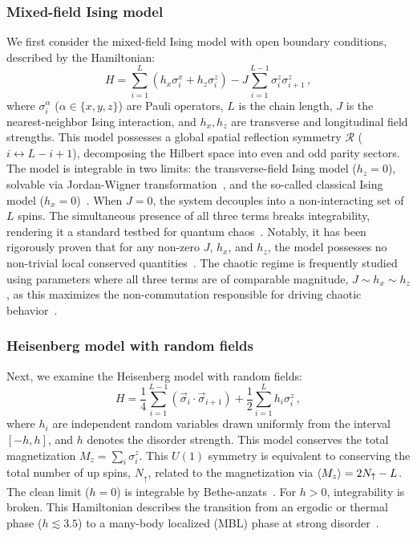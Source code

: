\documentclass[pra,twocolumn,aps,showpacs,superscriptaddress,longbibliography]{revtex4-2}
\begin{document}
\subsubsection{Mixed-field Ising model}\label{sec:ising}
We first consider the mixed-field Ising model with open boundary conditions, described by the Hamiltonian:
\begin{equation}\label{eq:H:ising}
H = \sum_{i=1}^L \left( h_x \sigma_i^x + h_z \sigma_i^z \right) - J \sum_{i=1}^{L-1} \sigma_i^z \sigma_{i+1}^z \, ,
\end{equation}
where $\sigma_i^\alpha$ ($\alpha \in \{x,y,z\}$) are Pauli operators, $L$ is the chain length, $J$ is the nearest-neighbor Ising interaction, and $h_x, h_z$ are transverse and longitudinal field strengths. This model possesses a global spatial reflection symmetry $\mathcal{R}$ ($i \leftrightarrow L-i+1$), decomposing the Hilbert space into even and odd parity sectors. The model is integrable in two limits: the transverse-field Ising model ($h_z = 0$), solvable via Jordan-Wigner transformation~\cite{sachdev_2011_quantum}, and the so-called classical Ising model ($h_x = 0$)~\cite{baxter_2007_exactly}. When $J=0$, the system decouples into a non-interacting set of $L$ spins. The simultaneous presence of all three terms breaks integrability, rendering it a standard testbed for quantum chaos~\cite{kim_2014_testing,garrison_2018_does,borgonovi_2016_quantum}. Notably, it has been rigorously proven that for any non-zero $J$, $h_x$, and $h_z$, the model possesses no non-trivial local conserved quantities~\cite{chiba_2024_proof}. The chaotic regime is frequently studied using parameters where all three terms are of comparable magnitude, $J \sim h_x \sim h_z$, as this maximizes the non-commutation responsible for driving chaotic behavior~\cite{karthik_2007_entanglement,atas_2017_quantum,camargo_2024_spread}.

\subsubsection{Heisenberg model with random fields}\label{sec:heisenberg}
Next, we examine the Heisenberg model with random fields:
\begin{equation}\label{eq:H:heisenberg}
H = \frac{1}{4}\sum_{i=1}^{L-1} \left(\vec{\sigma}_i \cdot \vec{\sigma}_{i+1}\right) + \frac{1}{2}\sum_{i=1}^L h_i \sigma_i^z \, ,
\end{equation}
where $h_i$ are independent random variables drawn uniformly from the interval $[-h, h]$, and $h$ denotes the disorder strength. This model conserves the total magnetization $M_z = \sum_i \sigma_i^z$. This $U(1)$ symmetry is equivalent to conserving the total number of up spins, $N_{\uparrow}$, related to the magnetization via $\ev{M_z} = 2N_{\uparrow} - L$. The clean limit ($h=0$) is integrable by Bethe-anzats~\cite{bethe_1931_zur}. For $h>0$, integrability is broken. This Hamiltonian describes the transition from an ergodic or thermal phase ($h \lesssim 3.5$) to a many-body localized (MBL) phase at strong disorder~\cite{oganesyan_2007_localization,luitz_2015_manybody,abanin_2019_colloquium}.
\end{document}
